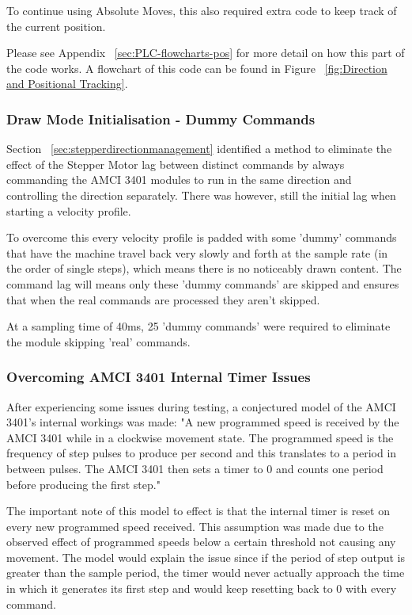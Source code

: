 			To continue using Absolute Moves, this also required extra code to keep track of the current position.
			
			Please see Appendix ~\ref{sec:PLC-flowcharts-pos} for more detail on how this part of the code works. A flowchart of this code can be found in Figure ~\ref{fig:Direction and Positional Tracking}.
			
	\subsubsection{Draw Mode Initialisation - Dummy Commands}
			Section ~\ref{sec:stepperdirectionmanagement} identified a method to eliminate the effect of the Stepper Motor lag between distinct commands by always commanding the AMCI 3401 modules to run in the same direction and controlling the direction separately. There was however, still the initial lag when starting a velocity profile.
			
			To overcome this every velocity profile is padded with some 'dummy' commands that have the machine travel back very slowly and forth at the sample rate  (in the order of single steps), which means there is no noticeably drawn content. The command lag will means only these 'dummy commands' are skipped and ensures that when the real commands are processed they aren't skipped.
			
			At a sampling time of 40ms, 25 'dummy commands' were required to eliminate the module skipping 'real' commands.

	\subsubsection{Overcoming AMCI 3401 Internal Timer Issues}
			After experiencing some issues during testing, a conjectured model of the AMCI 3401's internal workings was made: "A new programmed speed is received by the AMCI 3401 while in a clockwise movement state. The programmed speed is the frequency of step pulses to produce per second and this translates to a period in between pulses. The AMCI 3401 then sets a timer to 0 and counts one period before producing the first step."
			
			The important note of this model to effect is that the internal timer is reset on every new programmed speed received. This assumption was made due to the observed effect of programmed speeds below a certain threshold not causing any movement. The model would explain the issue since if the period of step output is greater than the sample period, the timer would never actually approach the time in which it generates its first step and would keep resetting back to 0 with every command.
			
